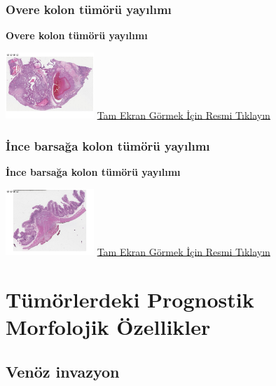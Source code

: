 \documentclass[
  letterpaper,
  DIV=11,
  numbers=noendperiod]{scrreprt}
\begin{document}
\hypertarget{sec-overe-kolon-tumor-yayilimi}{%
\section{Overe kolon tümörü
yayılımı}\label{sec-overe-kolon-tumor-yayilimi}}

\textbf{Overe kolon tümörü yayılımı}

\href{https://images.patolojiatlasi.com/tumor-spread/HE-over.html}{\includegraphics[width=0.25\textwidth,height=\textheight]{./screenshots/tumor-spread-over_screenshot.png}}
\href{https://images.patolojiatlasi.com/tumor-spread/HE-over.html}{Tam
Ekran Görmek İçin Resmi Tıklayın}

\hypertarget{sec-ince-barsak-kolon-tumor-yayilimi}{%
\section{İnce barsağa kolon tümörü
yayılımı}\label{sec-ince-barsak-kolon-tumor-yayilimi}}

\textbf{İnce barsağa kolon tümörü yayılımı}

\href{https://images.patolojiatlasi.com/tumor-spread/HE-small-intestine.html}{\includegraphics[width=0.25\textwidth,height=\textheight]{./screenshots/tumor-spread-small-intestine_screenshot.png}}
\href{https://images.patolojiatlasi.com/tumor-spread/HE-small-intestine.html}{Tam
Ekran Görmek İçin Resmi Tıklayın}

\part{Tümörlerdeki Prognostik Morfolojik Özellikler}

\hypertarget{sec-venoz-invazyon}{%
\chapter{Venöz invazyon}\label{sec-venoz-invazyon}}
\end{document}
